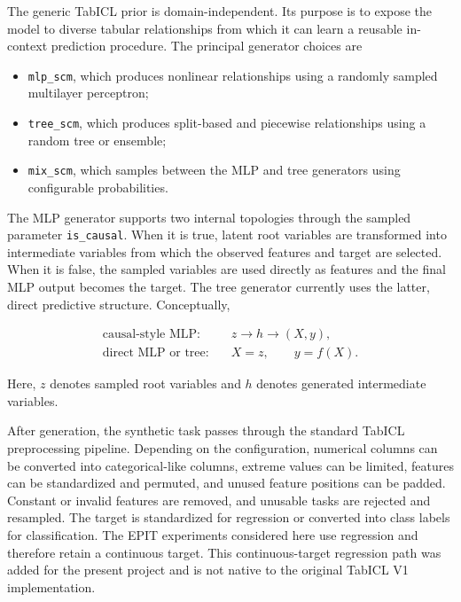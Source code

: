 \documentclass{article}
\begin{document}
The generic TabICL prior is domain-independent. Its purpose is to expose the model to diverse tabular relationships from which it can learn a reusable in-context prediction procedure. The principal generator choices are

\begin{itemize}
    \item \texttt{mlp\_scm}, which produces nonlinear relationships using a randomly sampled multilayer perceptron;
    \item \texttt{tree\_scm}, which produces split-based and piecewise relationships using a random tree or ensemble;
    \item \texttt{mix\_scm}, which samples between the MLP and tree generators using configurable probabilities.
\end{itemize}

The MLP generator supports two internal topologies through the sampled parameter \texttt{is\_causal}. When it is true, latent root variables are transformed into intermediate variables from which the observed features and target are selected. When it is false, the sampled variables are used directly as features and the final MLP output becomes the target. The tree generator currently uses the latter, direct predictive structure. Conceptually,

\begin{equation}
\begin{aligned}
\text{causal-style MLP:}\quad
&z \longrightarrow h \longrightarrow (X,y),\\
\text{direct MLP or tree:}\quad
&X=z,\qquad y=f(X).
\end{aligned}
\label{eq:generic-generator-modes}
\end{equation}

Here, \(z\) denotes sampled root variables and \(h\) denotes generated intermediate variables. 

After generation, the synthetic task passes through the standard TabICL preprocessing pipeline. Depending on the configuration, numerical columns can be converted into categorical-like columns, extreme values can be limited, features can be standardized and permuted, and unused feature positions can be padded. Constant or invalid features are removed, and unusable tasks are rejected and resampled. The target is standardized for regression or converted into class labels for classification. The EPIT experiments considered here use regression and therefore retain a continuous target. This continuous-target regression path was added for the present project and is not native to the original TabICL V1 implementation.
\end{document}
